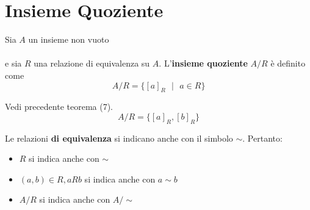 \documentclass[a4paper,12pt, oneside]{book}
\begin{document}
	\section{Insieme Quoziente}
		\begin{definizione}
			Sia $A$ un insieme non vuoto\\\\
			e sia $R$ una relazione di equivalenza su $A$.
			L'\textbf{insieme quoziente} $A/R$ è definito come
			$$A/R = \{[a]_{R} \mbox{ }|\mbox{ } a \in R\}$$
		\end{definizione}
		\begin{shaded}
			\begin{esempio}
				Vedi precedente teorema (7).
				$$A/R = \{[a]_{R},[b]_{R}\}$$
			\end{esempio}
		\end{shaded}
		\begin{osservazione}
			Le relazioni \textbf{di equivalenza} si indicano anche con il simbolo $\sim$. Pertanto:
			\begin{itemize}
				\item $R$ si indica anche con $\sim$
				\item $(a,b) \in R, aRb$ si indica anche con $a \sim b$
				\item $A/R$ si indica anche con $A/\sim$
			\end{itemize}
		\end{osservazione}
		
\end{document}
